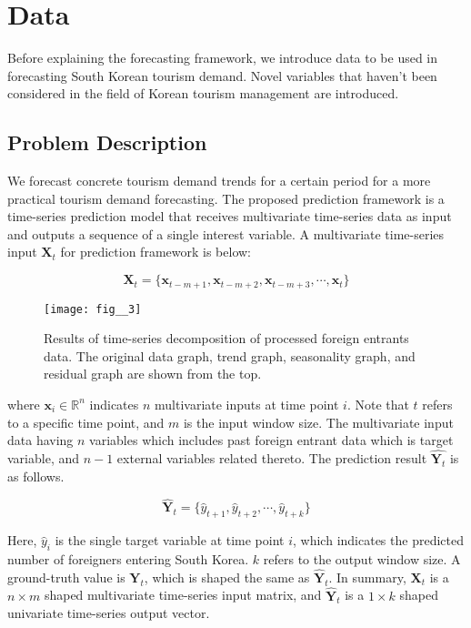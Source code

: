 \documentclass[conference]{IEEEtran}
\begin{document}
\section{Data} \label{Data}
Before explaining the forecasting framework, we introduce data to be used in forecasting South Korean tourism demand. Novel variables that haven’t been considered in the field of Korean tourism management are introduced.

\subsection{Problem Description}\label{PD}
We forecast concrete tourism demand trends for a certain period for a more practical tourism demand forecasting. The proposed prediction framework is a time-series prediction model that receives multivariate time-series data as input and outputs a sequence of a single interest variable. A multivariate time-series input \(\mathbf{X}_t\) for prediction framework is below:

\[\mathbf{X}_t = \{\mathbf{x}_{t-m+1}, \mathbf{x}_{t-m+2}, \mathbf{x}_{t-m+3}, \cdots, \mathbf{x}_t\}\]

\begin{figure}[t]
\begin{center}
\texttt{[image: fig\_\_3]}
\end{center}
   \caption{Results of time-series decomposition of processed foreign entrants data. The original data graph, trend graph, seasonality graph, and residual graph are shown from the top.}
\label{fig:fig3}
\end{figure}

\noindent where \(\mathbf{x}_i \in \mathbb{R}^{n}\) indicates \(n\) multivariate inputs at time point \(i\). Note that \(t\) refers to a specific time point, and \(m\) is the input window size. The multivariate input data having \(n\) variables which includes past foreign entrant data which is target variable, and \(n-1\) external variables related thereto. The prediction result \(\hat{\mathbf{Y}_t}\) is as follows.

\[\hat{\mathbf{Y}}_t = \{\hat{y}_{t+1},\hat{y}_{t+2}, \cdots, \hat{y}_{t+k} \}\]

\noindent Here, \(\hat{y}_i\) is the single target variable at time point \(i\), which indicates the predicted number of foreigners entering South Korea. \(k\) refers to the output window size. A ground-truth value is \(\mathbf{Y}_t\), which is shaped the same as \(\hat{\mathbf{Y}}_t\). In summary, \(\mathbf{X}_t\) is a \(n \times m\) shaped multivariate time-series input matrix, and \(\hat{\mathbf{Y}}_t\) is a \(1 \times k\) shaped univariate time-series output vector.
\end{document}
